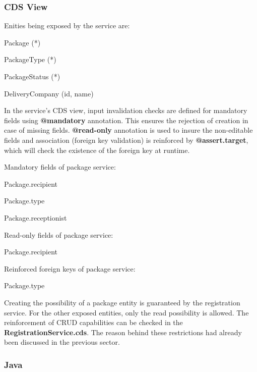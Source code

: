 \subsubsection{CDS View}

Enities being exposed by the service are:
\begin{compactenum}
	\item Package (*)
    \item PackageType (*)
    \item PackageStatus (*)
    \item DeliveryCompany (id, name)
\end{compactenum}

\bigskip
In the service's CDS view, input invalidation checks are defined for mandatory fields using \textbf{@mandatory} annotation. This ensures the rejection of creation in case of missing fields. \textbf{@read-only} annotation is used to insure the non-editable fields and association (foreign key validation) is reinforced by \textbf{@assert.target}, which will check the existence of the foreign key at runtime.

\bigskip
Mandatory fields of package service:
\begin{compactenum}
	\item Package.recipient
    \item Package.type
    \item Package.receptionist
\end{compactenum}

\bigskip
Read-only fields of package service:
\begin{compactenum}
	\item Package.recipient
\end{compactenum}

\bigskip
Reinforced foreign keys of package service:
\begin{compactenum}
	\item Package.type
\end{compactenum}

\bigskip
Creating the possibility of a package entity is guaranteed by the registration service. For the other exposed entities, only the read possibility is allowed. The reinforcement of CRUD capabilities can be checked in the \textbf{RegistrationService.cds}. The reason behind these restrictions had already been discussed in the previous sector.

\subsubsection{Java}

